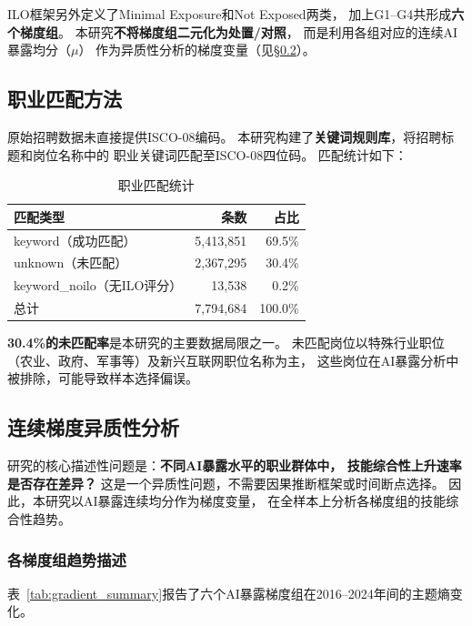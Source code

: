 \documentclass[12pt,a4paper]{ctexart}
\begin{document}
ILO框架另外定义了Minimal Exposure和Not Exposed两类，
加上G1--G4共形成\textbf{六个梯度组}。
本研究\textbf{不将梯度组二元化为处置/对照}，
而是利用各组对应的连续AI暴露均分（$\mu$）
作为异质性分析的梯度变量（见\S\ref{subsec:gradient_analysis}）。

\subsection{职业匹配方法}

原始招聘数据未直接提供ISCO-08编码。
本研究构建了\textbf{关键词规则库}，将招聘标题和岗位名称中的
职业关键词匹配至ISCO-08四位码。
匹配统计如下：

\begin{table}[h!]
\centering
\caption{职业匹配统计}
\label{tab:match_stats}
\begin{tabular}{lrr}
\toprule
匹配类型 & 条数 & 占比 \\
\midrule
keyword（成功匹配） & 5,413,851 & 69.5\% \\
unknown（未匹配） & 2,367,295 & 30.4\% \\
keyword\_noilo（无ILO评分） & 13,538 & 0.2\% \\
\midrule
总计 & 7,794,684 & 100.0\% \\
\bottomrule
\end{tabular}
\end{table}

\textbf{30.4\%的未匹配率}是本研究的主要数据局限之一。
未匹配岗位以特殊行业职位（农业、政府、军事等）及新兴互联网职位名称为主，
这些岗位在AI暴露分析中被排除，可能导致样本选择偏误。

\subsection{连续梯度异质性分析}
\label{subsec:gradient_analysis}

研究的核心描述性问题是：\textbf{不同AI暴露水平的职业群体中，
技能综合性上升速率是否存在差异？}
这是一个异质性问题，不需要因果推断框架或时间断点选择。
因此，本研究以AI暴露连续均分作为梯度变量，
在全样本上分析各梯度组的技能综合性趋势。

\subsubsection{各梯度组趋势描述}

表~\ref{tab:gradient_summary}报告了六个AI暴露梯度组在2016--2024年间的主题熵变化。
\end{document}
